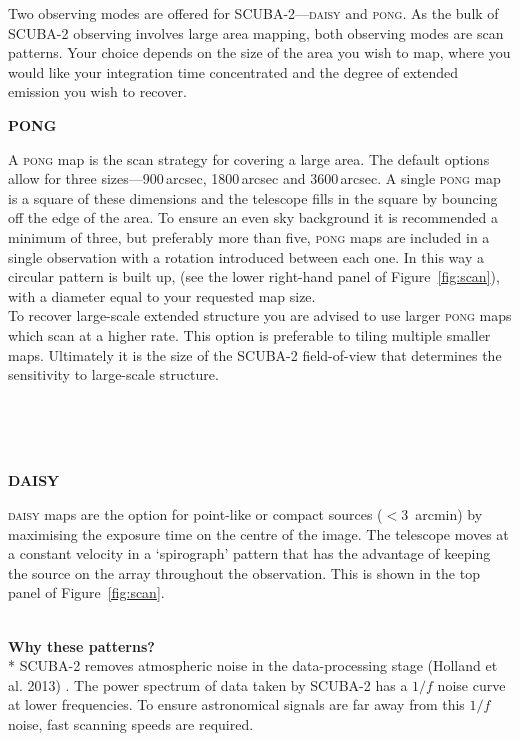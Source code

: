 \documentclass[twoside,11pt]{article}
\newcommand{\htmlref}[2]{#1}
\newcommand{\latex}[1]{#1}
\newcommand{\latexhtml}[2]{#1}
\renewcommand{\_}{\texttt{\symbol{95}}}
\newcommand{\cref}[3]{\latexhtml{#1~\ref{#2}}{\htmlref{#3}{#2}}}
\begin{document}
Two observing modes are offered for SCUBA-2---\textsc{daisy} and
\textsc{pong}. As the bulk of \mbox{SCUBA-2} observing involves
large area mapping, both observing modes are scan patterns. Your
choice depends on the size of the area you wish to map, where you
would like your integration time concentrated and the degree of
extended emission you wish to recover.
\newline\newline
\begin{minipage}[t]{0.12\linewidth}
\textbf{PONG}
\end{minipage}
\begin{minipage}[t]{0.87\linewidth}A \textsc{pong} map is the scan
strategy for covering a large area. The default options allow for three
sizes---900\,arcsec, 1800\,arcsec and 3600\,arcsec. A single \textsc{pong} map is
a square of these dimensions and the telescope fills in the square by
bouncing off the edge of the area. To ensure an even sky background it
is recommended a minimum of three, but preferably more than five,
\textsc{pong} maps are included in a single observation with a
rotation introduced between each one. In this way a circular pattern
is built up, (see the lower right-hand panel of \cref{Figure}{fig:scan}{graphic below}),
with a diameter equal to your requested map size.
\vspace{0.2cm}\\
To recover large-scale extended structure you are advised to use
larger \textsc{pong} maps which scan at a higher rate. This option is
preferable to tiling multiple smaller maps. Ultimately it is the
size of the SCUBA-2 field-of-view that determines the sensitivity to
large-scale structure.
\end{minipage}
\latex{\\ \\ \\}
\begin{minipage}[t]{0.12\linewidth}
\textbf{DAISY}
\end{minipage}
\begin{minipage}[t]{0.87\linewidth}
\textsc{daisy} maps are the option for point-like or compact sources
($<$3~arcmin) by maximising the exposure time on the centre of the
image. The telescope moves at a constant velocity in a `spirograph'
pattern that has the advantage of keeping the source on the array
throughout the observation. This is shown in the top panel of
\cref{Figure}{fig:scan}{the figure below}.
\end{minipage}
\latex{\vspace{1cm}}\\
\textbf{Why these patterns?}\\*
SCUBA-2 removes atmospheric noise in the data-processing
stage (Holland et al. 2013) \cite{s2main}. The power spectrum
of data taken by SCUBA-2 has a $1/f$ noise curve at lower frequencies. To
ensure astronomical signals are far away from this $1/f$ noise, fast
scanning speeds are required.
\end{document}
